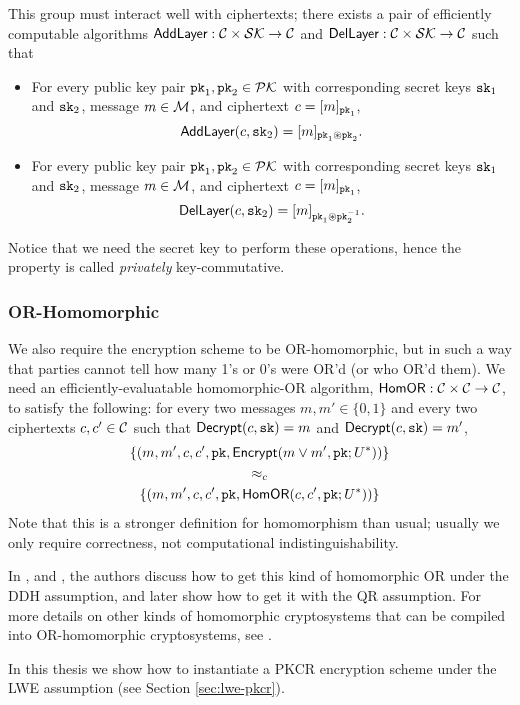 This group must interact well with ciphertexts; there exists a pair of efficiently computable algorithms $\textsf{AddLayer} : \mathcal{C} \times \mathcal{SK} \to \mathcal{C}$ and $\textsf{DelLayer} : \mathcal{C} \times \mathcal{SK} \to \mathcal{C}$ such that
\begin{itemize}
	\item For every public key pair $\texttt{pk}_1, \texttt{pk}_2 \in \mathcal{PK}$ with corresponding secret keys $\texttt{sk}_1$ and $\texttt{sk}_2$, message $m \in \mathcal{M}$, and ciphertext $c = [m]_{\texttt{pk}_1}$,
	\[\textsf{AddLayer}(c, \texttt{sk}_2) = [m]_{\texttt{pk}_1 \circledast \texttt{pk}_2}.\]
	\item For every public key pair $\texttt{pk}_1, \texttt{pk}_2 \in \mathcal{PK}$ with corresponding secret keys $\texttt{sk}_1$ and $\texttt{sk}_2$, message $m \in \mathcal{M}$, and ciphertext $c = [m]_{\texttt{pk}_1}$,
	\[\textsf{DelLayer}(c, \texttt{sk}_2) = [m]_{\texttt{pk}_1 \circledast \texttt{pk}_2^{-1}}.\]
\end{itemize}
Notice that we need the secret key to perform these operations, hence the property is called \emph{privately} key-commutative.

\subsubsection{OR-Homomorphic}
We also require the encryption scheme to be OR-ho\-mo\-mor\-phic, but in such a way that parties cannot tell how many 1's or 0's were OR'd (or who OR'd them). 
We need an efficiently-evaluatable homomorphic-OR algorithm, $\textsf{HomOR} : \mathcal{C} \times \mathcal{C} \to \mathcal{C}$, to satisfy the following: for every two messages $m, m' \in \{0,1\}$ and every two ciphertexts $c, c' \in \mathcal{C}$ such that $\textsf{Decrypt}(c, \texttt{sk}) = m$ and $\textsf{Decrypt}(c, \texttt{sk}) = m'$,
\begin{gather*}
\left\{ (m,m', c,c', \texttt{pk}, \textsf{Encrypt}(m \lor m', \texttt{pk}; U^*)) \right\} \\
\approx_c \\
\left\{ (m,m', c,c', \texttt{pk}, \textsf{HomOR}(c, c', \texttt{pk}; U^*)) \right\}\\
\end{gather*}
Note that this is a stronger definition for homomorphism than usual; usually we only require correctness, not computational indistinguishability.

In \cite{C:HMTZ16}, \cite{EC:AkaMor17} and \cite{C:AkaLaVMor17}, the authors discuss how to get this kind of homomorphic OR under the DDH assumption, and later \cite{EPRINT:AkaLaVMor17} show how to get it with the QR assumption. For more details on other kinds of homomorphic cryptosystems that can be compiled into OR-homomorphic cryptosystems, see \cite{EPRINT:AkaLaVMor17}.

In this thesis we show how to instantiate a PKCR encryption scheme under the LWE assumption (see Section \ref{sec:lwe-pkcr}).